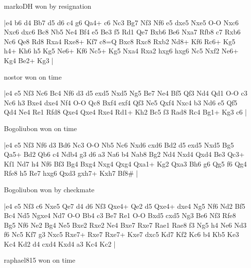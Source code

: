 \showboard

markoDH won by resignation

\makegametitle
|e4 b6 d4 Bb7 d5 d6 c4 g6 Qa4+ c6 Nc3 Bg7 Nf3 Nf6 e5 dxe5 Nxe5 O-O Nxc6 Nxc6 dxc6 Bc8 Nb5 Ne4 Bf4 e5 Be3 f5 Rd1 Qe7 Bxb6 Be6 Nxa7 Rfb8 c7 Rxb6 Nc6 Qe8 Rd8 Rxa4 Rxe8+ Kf7 c8=Q Bxc8 Rxc8 Rxb2 Nd8+ Kf6 Rc6+ Kg5 h4+ Kh6 h5 Kg5 Ne6+ Kf6 Nc5+ Kg5 Nxa4 Rxa2 hxg6 hxg6 Nc5 Nxf2 Ne6+ Kg4 Be2+ Kg3  |

\showboard

nostor won on time

\makegametitle
|e4 e5 Nf3 Nc6 Bc4 Nf6 d3 d5 exd5 Nxd5 Ng5 Be7 Ne4 Bf5 Qf3 Nd4 Qd1 O-O c3 Nc6 h3 Bxe4 dxe4 Nf4 O-O Qc8 Bxf4 exf4 Qf3 Ne5 Qxf4 Nxc4 b3 Nd6 e5 Qf5 Qd4 Ne4 Re1 Rfd8 Qxe4 Qxe4 Rxe4 Rd1+ Kh2 Bc5 f3 Rad8 Rc4 Bg1+ Kg3 c6  |

\showboard

Bogoliubon won on time

\makegametitle
|e4 e5 Nf3 Nf6 d3 Bd6 Nc3 O-O Nb5 Nc6 Nxd6 cxd6 Bd2 d5 exd5 Nxd5 Bg5 Qa5+ Bd2 Qb6 c4 Ndb4 g3 d6 a3 Na6 b4 Nab8 Bg2 Nd4 Nxd4 Qxd4 Be3 Qc3+ Kf1 Nd7 h4 Nf6 Bf3 Bg4 Bxg4 Nxg4 Qxg4 Qxa1+ Kg2 Qxa3 Bh6 g6 Qg5 f6 Qg4 Rfe8 h5 Re7 hxg6 Qxd3 gxh7+ Kxh7 Bf8\#  |

\showboard

Bogoliubon won by checkmate

\makegametitle
|e4 e5 Nf3 c6 Nxe5 Qe7 d4 d6 Nf3 Qxe4+ Qe2 d5 Qxe4+ dxe4 Ng5 Nf6 Nd2 Bf5 Bc4 Nd5 Ngxe4 Nd7 O-O Bb4 c3 Be7 Re1 O-O Bxd5 cxd5 Ng3 Be6 Nf3 Rfe8 Bg5 Nf6 Ne2 Bg4 Ne5 Bxe2 Rxe2 Ne4 Bxe7 Rxe7 Rae1 Rae8 f3 Ng5 h4 Ne6 Nd3 f6 Nc5 Kf7 g3 Nxc5 Rxe7+ Rxe7 Rxe7+ Kxe7 dxc5 Kd7 Kf2 Kc6 b4 Kb5 Ke3 Kc4 Kd2 d4 cxd4 Kxd4 a3 Kc4 Kc2  |

\showboard

raphael815 won on time

